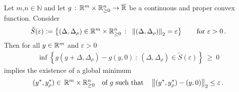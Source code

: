 \begin{lemma}
  Let $m$,$n\in\mathbb{N}$ and let 
  $
  g \,:\, \mathbb{R}^m\times \mathbb{R}^n_{\ge 0} \to \overline{\mathbb{R}}
  $ 
  be a continuous and proper convex function.
  Consider 
  \begin{gather*}
    \tilde{S}(\varepsilon)
    :=
    \left\{ 
      (
      \Delta,
      \Delta_\rho
      )
      \in
      \R^m \times \R^n_{\ge 0}
      \ 
      \colon
      \ 
      \norm{
      (
      \Delta,
      \Delta_\rho
      )
      }_2
      =
      \varepsilon
    \right\}
    \qquad
    \text{for}
    \ 
    \varepsilon>0
    \,.
  \end{gather*}
Then 
  for all $y \in \mathbb{R}^m$ and $\varepsilon>0$ 
    \begin{gather}
      \label{696}
      \inf 
      \left\{ 
        g(y+
        \Delta,\Delta_\rho)
        -
        g(y,0)
      \ 
        \colon
      \ 
      (
      \Delta,
      \Delta_\rho
      )
      \in
    \tilde{S}(\varepsilon)
      \right\}
      \ 
      \ge
      \ 
      0
    \end{gather}
    implies
    the existence of  
    a global minimum
    \begin{gather*}
    (
    y^*
    ,
    y^*_\rho
    )
    \in \,\mathbb{R}^m\times\mathbb{R}^n_{\ge 0}
    \quad
    \text{of $g$ such that}\quad
      \left\lVert
    (
    y^*
    ,
    y^*_\rho
    )
      - (y,0)\right\rVert_2 \le \varepsilon
      \,.
    \end{gather*}
\end{lemma}
